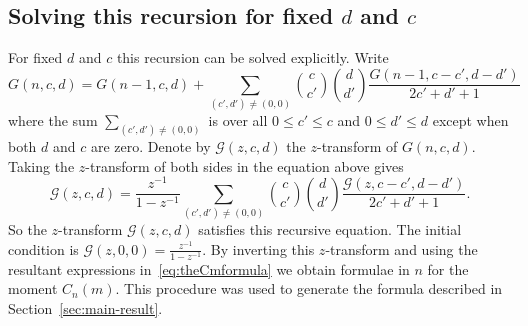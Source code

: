\documentclass[draftcls, onecolumn, 11pt]{IEEEtran}
\begin{document}
\subsection{Solving this recursion for fixed $d$ and $c$}\label{sec:solv-this-recurs}
\newcommand{\calG}{\mathcal G}

For fixed $d$ and $c$ this recursion can be solved explicitly.  Write
\[
G(n,c,d) = G(n-1,c,d) + \sum_{ (c',d') \neq (0,0)} \binom{c}{c'}\binom{d}{d'} \frac{G(n-1,c-c',d-d')}{2c'+d'+1}
\]
where the sum $\sum_{ (c',d') \neq (0,0)}$ is over all $0 \leq c' \leq c$ and $0 \leq d' \leq d$ except when both $d$ and $c$ are zero.  Denote by $\calG(z,c,d)$ the $z$-transform of $G(n,c,d)$.  Taking the $z$-transform of both sides in the equation above gives
\[
\calG(z,c,d) = \frac{z^{-1}}{1-z^{-1}} \sum_{ (c',d') \neq (0,0)} \binom{c}{c'}\binom{d}{d'} \frac{\calG(z,c-c',d-d')}{2c'+d'+1}.
\]
So the $z$-transform $\calG(z,c,d)$ satisfies this recursive equation.  The initial condition is $\calG(z,0,0) = \frac{z^{-1}}{1 - z^{-1}}$.  By inverting this $z$-transform and using the resultant expressions in~\eqref{eq:theCmformula} we obtain formulae in $n$ for the moment $C_n(m)$.  This procedure was used to generate the formula described in Section~\ref{sec:main-result}.




\small





\end{document}
